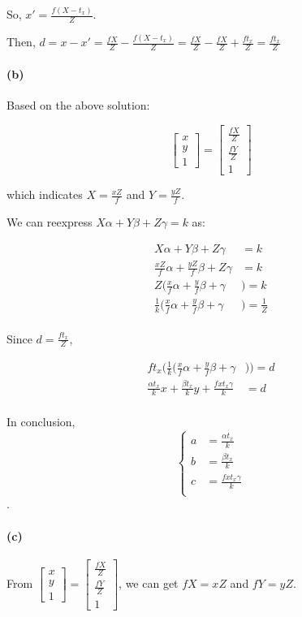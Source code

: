 \documentclass{article}
\newcommand{\spart}[1]{\paragraph{(#1)}}
\begin{document}
So, $x' = \frac{f(X-t_x)}{Z}$.

Then, $d = x - x' = \frac{fX}{Z} - \frac{f(X-t_x)}{Z} = 
\frac{fX}{Z} - \frac{fX}{Z} + \frac{ft_x}{Z} = \frac{ft_x}{Z}$

\spart{b}

Based on the above solution:

$$
  \begin{bmatrix}
    x \\ y \\ 1
  \end{bmatrix} =  \begin{bmatrix}
    \frac{fX}{Z} \\ \frac{fY}{Z} \\ 1
  \end{bmatrix} 
$$

which indicates $X = \frac{xZ}{f}$ and $Y = \frac{yZ}{f}$.

We can reexpress $X\alpha + Y\beta + Z\gamma = k$ as:

$$
  \begin{aligned}
    X\alpha + Y\beta + Z\gamma & = k \\
    \frac{xZ}{f}\alpha + \frac{yZ}{f}\beta + Z\gamma & = k \\
    Z (\frac{x}{f}\alpha + \frac{y}{f}\beta + \gamma & ) = k \\
    \frac{1}{k} (\frac{x}{f}\alpha + \frac{y}{f}\beta + \gamma & ) = \frac{1}{Z} \\
  \end{aligned}
$$

Since $d =  \frac{ft_x}{Z}$,

$$
  \begin{aligned}
    ft_x \bigg ( \frac{1}{k} (\frac{x}{f}\alpha + \frac{y}{f}\beta + \gamma & ) \bigg )= d \\
    \frac{\alpha t_x}{k}x + \frac{\beta t_x}{k}y + \frac{fxt_x\gamma}{k} & = d \\
  \end{aligned}
$$

In conclusion, $$\begin{cases}
    a & = \frac{\alpha t_x}{k} \\
    b & = \frac{\beta t_x}{k} \\
    c & = \frac{fxt_x\gamma}{k} \\
\end{cases}$$.

\spart{c}

From $
\begin{bmatrix}
  x \\ y \\ 1
\end{bmatrix} = \begin{bmatrix}
  \frac{fX}{Z} \\ \frac{fY}{Z} \\ 1
\end{bmatrix} 
$, we can get $fX = xZ$ and $fY = yZ$.
\end{document}
